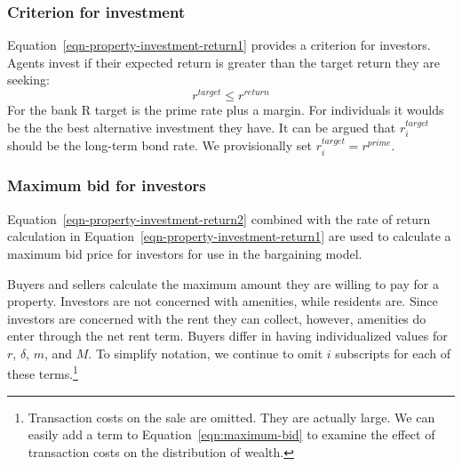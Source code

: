 {\subsubsection{Criterion for investment}
Equation~\ref{eqn-property-investment-return1} provides a criterion for investors. %
 Agents invest if  their expected return is greater than the target return they are seeking:
\begin{equation}
r^{target}\le r^{return} 
\label{eqn-property-investment-return2}
\end{equation}
For the bank R target is the prime rate plus a margin. For individuals it woulds be the the best alternative investment they have. It can be argued that  $r^{target}_i$ should be the long-term bond rate. We provisionally set $r^{target}_i=r^{prime}$.

\subsubsection{Maximum bid for investors}
Equation~\ref{eqn-property-investment-return2} combined with the rate of return calculation in Equation~\ref{eqn-property-investment-return1} are used to calculate a maximum bid price for investors for use in the bargaining model.
% 



Buyers and sellers calculate the maximum amount they are willing to pay for a property.  Investors are not concerned with amenities, while residents are. Since investors are concerned with the rent they can collect, however, amenities do enter through the net rent term. Buyers differ in having individualized values for $r$, $\delta$, $m$, and $M$. To simplify notation, we continue to omit  $i$ subscripts for each of these terms.\footnote{Transaction costs on the sale are omitted. They are actually large. We can easily add a term to  Equation~\ref{eqn:maximum-bid} to examine the effect of transaction costs on the distribution of wealth.}



}
